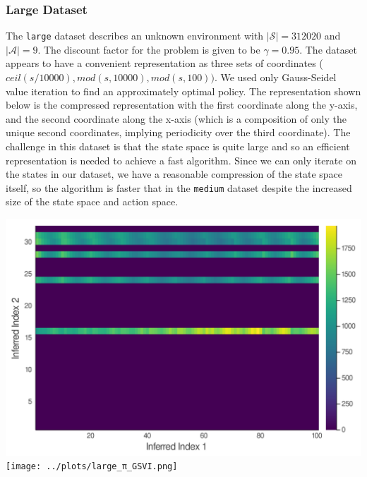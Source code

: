 \documentclass[10pt,letterpaper]{article}
\newenvironment{Figure}
{\par\medskip\noindent\minipage{\linewidth}}
{\endminipage\par\medskip}
\begin{document}
\begin{multicols*}{2}
	\subsubsection*{\sf \textbf{Large Dataset}}
	The \texttt{large} dataset describes an unknown environment with $|\mathcal{S}| = 312020$ and $|\mathcal{A}| = 9$. The discount factor for the problem is given to be $\gamma = 0.95$. The dataset appears to have a convenient representation as three sets of coordinates ($ceil(s/10000), mod(s, 10000), mod(s, 100))$.
	We used only Gauss-Seidel value iteration to find an approximately optimal policy. The representation shown below is the compressed representation with the first coordinate along the y-axis, and the second coordinate along the x-axis (which is a composition of only the unique second coordinates, implying periodicity over the third coordinate). The challenge in this dataset is that the state space is quite large and so an efficient representation is needed to achieve a fast algorithm. Since we can only iterate on the states in our dataset, we have a reasonable compression of the state space itself, so the algorithm is faster that in the \texttt{medium} dataset despite the increased size of the state space and action space.
	\begin{Figure}
		\centering
		\includegraphics[width=\linewidth]{../plots/large_U_GSVI.png}
		\texttt{[image: ../plots/large\_π\_GSVI.png]}
		\label{fig:large_U_GSVI}
	\end{Figure} \vspace*{-0.1 in}

\end{multicols*}
\end{document}
